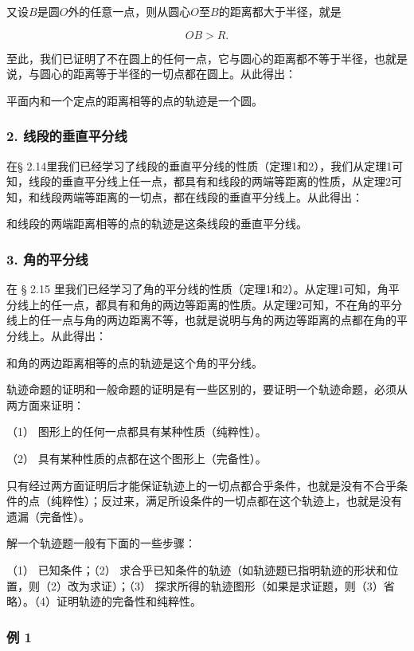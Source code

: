 又设\(B\)是圆\(O\)外的任意一点，则从圆心\(O\)至\(B\)的距离都大于半径，就是

\[
OB > R.
\]

至此，我们已证明了不在圆上的任何一点，它与圆心的距离都不等于半径，也就是说，与圆心的距离等于半径的一切点都在圆上。从此得出：

平面内和一个定点的距离相等的点的轨迹是一个圆。

\subsubsection{2.
线段的垂直平分线}

在§
2.14里我们已经学习了线段的垂直平分线的性质（定理1和2），我们从定理1可知，线段的垂直平分线上任一点，都具有和线段的两端等距离的性质，从定理2可知，和线段两端等距离的一切点，都在线段的垂直平分线上。从此得出：

和线段的两端距离相等的点的轨迹是这条线段的垂直平分线。

\subsubsection{3. 角的平分线}

在 § 2.15
里我们已经学习了角的平分线的性质（定理1和2）。从定理1可知，角平分线上的任一点，都具有和角的两边等距离的性质。从定理2可知，不在角的平分线上的任一点与角的两边距离不等，也就是说明与角的两边等距离的点都在角的平分线上。从此得出：

和角的两边距离相等的点的轨迹是这个角的平分线。

轨迹命题的证明和一般命题的证明是有一些区别的，要证明一个轨迹命题，必须从两方面来证明：

（1） 图形上的任何一点都具有某种性质（纯粹性）。

（2） 具有某种性质的点都在这个图形上（完备性）。

只有经过两方面证明后才能保证轨迹上的一切点都合乎条件，也就是没有不合乎条件的点（纯粹性）；反过来，满足所设条件的一切点都在这个轨迹上，也就是没有遗漏（完备性）。

解一个轨迹题一般有下面的一些步骤：

（1） 已知条件；（2）
求合乎已知条件的轨迹（如轨迹题已指明轨迹的形状和位置，则（2）改为求证）；（3）
探求所得的轨迹图形（如果是求证题，则（3）省略）。（4）证明轨迹的完备性和纯粹性。

\subsubsection{例 1}

